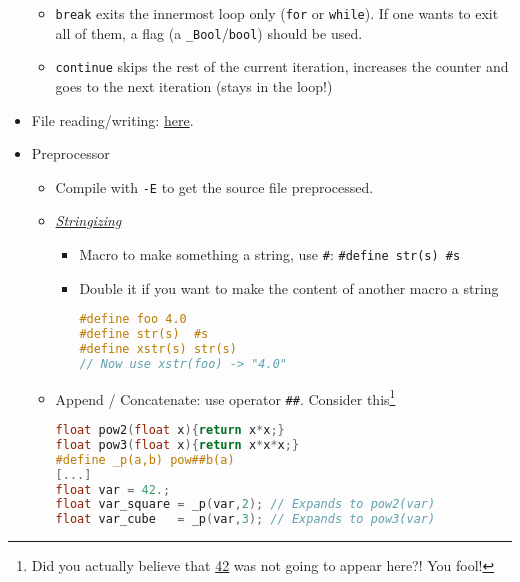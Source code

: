 \documentclass[a4paper,12pt,%
              final%
              ]{article}
\begin{document}
\begin{itemize}
\begin{itemize}
      \item \texttt{break} exits the innermost loop only (\texttt{for} or \texttt{while}). If one wants to exit all of them, a flag (a \verb|_Bool|/\verb|bool|) should be used.
      \item \texttt{continue} skips the rest of the current iteration, increases the counter and goes to the next iteration (stays in the loop!)
    \end{itemize}
  \item File reading/writing: \href{https://www.programiz.com/c-programming/c-file-input-output}{here}.
  \item Preprocessor
    \begin{itemize}
      \item Compile with \verb|-E| to get the source file preprocessed.
      \item \href{https://gcc.gnu.org/onlinedocs/gcc-7.5.0/cpp/Stringizing.html}{\emph{Stringizing}}
        \begin{itemize}
          \item Macro to make something a string, use \verb|#|: \verb|#define str(s) #s|
          \item Double it if you want to make the content of another macro a string
\begin{lstlisting}[language=C]
#define foo 4.0
#define str(s)  #s
#define xstr(s) str(s)
// Now use xstr(foo) -> "4.0"
\end{lstlisting}
        \end{itemize}
      \item Append / Concatenate: use operator \verb|##|. Consider this\footnote{Did you actually believe that \href{https://hitchhikers.fandom.com/wiki/42}{42} was not going to appear here?! You fool!}
\begin{lstlisting}[language=C]
float pow2(float x){return x*x;}
float pow3(float x){return x*x*x;}
#define _p(a,b) pow##b(a)
[...]
float var = 42.;
float var_square = _p(var,2); // Expands to pow2(var)
float var_cube   = _p(var,3); // Expands to pow3(var)
\end{lstlisting}
    \end{itemize}
  \end{itemize}
\end{document}
